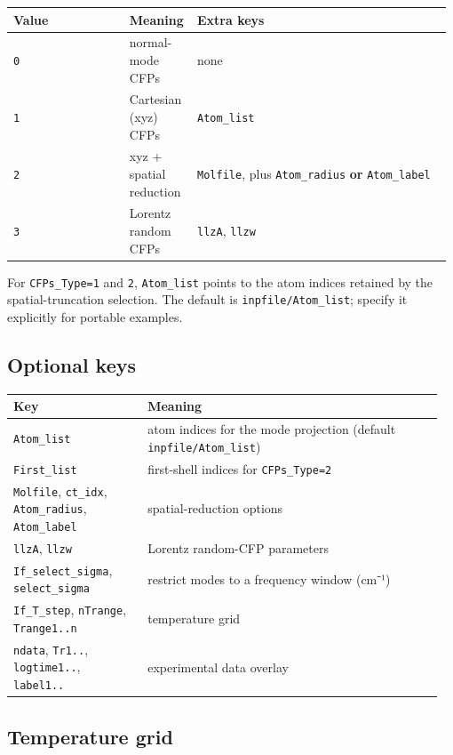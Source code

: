 \documentclass[11pt,a4paper]{article}
\begin{document}
\begin{longtable}[]{@{}>{\raggedright\arraybackslash}p{0.26\linewidth} >{\raggedright\arraybackslash}p{0.14\linewidth} >{\raggedright\arraybackslash}p{0.58\linewidth}@{}}
\toprule
Value & Meaning & Extra keys\tabularnewline
\midrule
\endhead
\texttt{0} & normal-mode CFPs & none\tabularnewline
\texttt{1} & Cartesian (xyz) CFPs & \texttt{Atom\_list}\tabularnewline
\texttt{2} & xyz + spatial reduction & \texttt{Molfile}, plus
\texttt{Atom\_radius} \textbf{or} \texttt{Atom\_label}\tabularnewline
\texttt{3} & Lorentz random CFPs & \texttt{llzA},
\texttt{llzw}\tabularnewline
\bottomrule
\end{longtable}

For \texttt{CFPs\_Type=1} and \texttt{2}, \texttt{Atom\_list} points to
the atom indices retained by the spatial-truncation selection. The
default is \texttt{inpfile/Atom\_list}; specify it explicitly for
portable examples.

\subsection{Optional keys}\label{optional-keys}

\begin{longtable}[]{@{}>{\raggedright\arraybackslash}p{0.30\linewidth} >{\raggedright\arraybackslash}p{0.66\linewidth}@{}}
\toprule
Key\strut
 & Meaning\strut
\tabularnewline
\midrule
\endhead
\texttt{Atom\_list}\strut
 & atom indices for the mode projection (default
\texttt{inpfile/Atom\_list})\strut
\tabularnewline
\texttt{First\_list}\strut
 & first-shell indices for \texttt{CFPs\_Type=2}\strut
\tabularnewline
\texttt{Molfile}, \texttt{ct\_idx}, \texttt{Atom\_radius},
\texttt{Atom\_label}\strut
 & spatial-reduction options\strut
\tabularnewline
\texttt{llzA}, \texttt{llzw}\strut
 & Lorentz random-CFP parameters\strut
\tabularnewline
\texttt{If\_select\_sigma}, \texttt{select\_sigma}\strut
 & restrict modes to a frequency window (cm⁻¹)\strut
\tabularnewline
\texttt{If\_T\_step}, \texttt{nTrange}, \texttt{Trange1..n}\strut
 & temperature grid\strut
\tabularnewline
\texttt{ndata}, \texttt{Tr1..}, \texttt{logtime1..},
\texttt{label1..}\strut
 & experimental data overlay\strut
\tabularnewline
\bottomrule
\end{longtable}

\subsection{Temperature grid}\label{temperature-grid}
\end{document}
